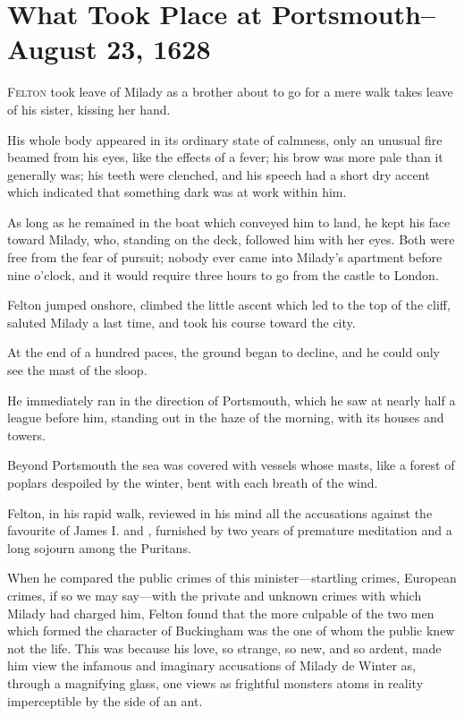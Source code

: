 
\chapter{What Took Place at Portsmouth--August 23, 1628}

\lettrine{F}{elton} took leave of Milady as a brother about to go for a mere walk takes leave of his sister, kissing her hand. 

\zz
His whole body appeared in its ordinary state of calmness, only an unusual fire beamed from his eyes, like the effects of a fever; his brow was more pale than it generally was; his teeth were clenched, and his speech had a short dry accent which indicated that something dark was at work within him. 

As long as he remained in the boat which conveyed him to land, he kept his face toward Milady, who, standing on the deck, followed him with her eyes. Both were free from the fear of pursuit; nobody ever came into Milady's apartment before nine o'clock, and it would require three hours to go from the castle to London. 

Felton jumped onshore, climbed the little ascent which led to the top of the cliff, saluted Milady a last time, and took his course toward the city. 

At the end of a hundred paces, the ground began to decline, and he could only see the mast of the sloop. 

He immediately ran in the direction of Portsmouth, which he saw at nearly half a league before him, standing out in the haze of the morning, with its houses and towers. 

Beyond Portsmouth the sea was covered with vessels whose masts, like a forest of poplars despoiled by the winter, bent with each breath of the wind. 

Felton, in his rapid walk, reviewed in his mind all the accusations against the favourite of James I. and , furnished by two years of premature meditation and a long sojourn among the Puritans. 

When he compared the public crimes of this minister—startling crimes, European crimes, if so we may say—with the private and unknown crimes with which Milady had charged him, Felton found that the more culpable of the two men which formed the character of Buckingham was the one of whom the public knew not the life. This was because his love, so strange, so new, and so ardent, made him view the infamous and imaginary accusations of Milady de Winter as, through a magnifying glass, one views as frightful monsters atoms in reality imperceptible by the side of an ant. 

